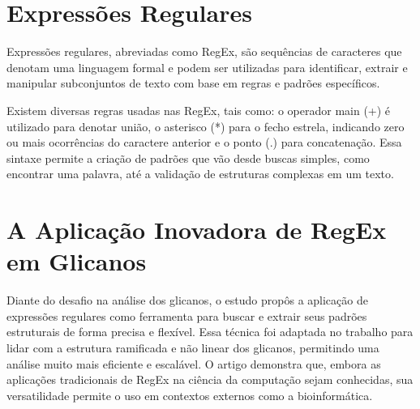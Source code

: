 \section{Expressões Regulares}

\begin{definition}
  Expressões regulares, abreviadas como RegEx, são sequências de caracteres que denotam uma linguagem formal e podem ser utilizadas para identificar, extrair e manipular subconjuntos de texto com base em regras
  e padrões específicos.
\end{definition}

Existem diversas regras usadas nas RegEx, tais como: o operador main (+) é
utilizado para denotar união, o asterisco (*) para o fecho estrela, indicando
zero ou mais ocorrências do caractere anterior e o ponto (.) para concatenação.
Essa sintaxe permite a criação de padrões que vão desde buscas simples, como
encontrar uma palavra, até a validação de estruturas complexas em um texto.

\section{A Aplicação Inovadora de RegEx em Glicanos}

Diante do desafio na análise dos glicanos, o estudo propôs a aplicação de
expressões regulares como ferramenta para buscar e extrair seus padrões
estruturais de forma precisa e flexível. Essa técnica foi adaptada no trabalho
para lidar com a estrutura ramificada e não linear dos glicanos, permitindo uma
análise muito mais eficiente e escalável. O artigo demonstra que, embora as
aplicações tradicionais de RegEx na ciência da computação sejam conhecidas, sua
versatilidade permite o uso em contextos externos como a bioinformática.